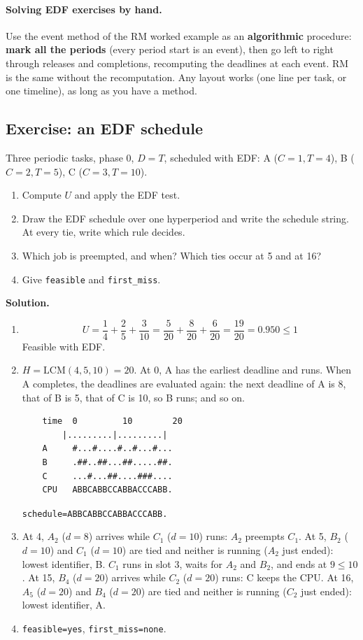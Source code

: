 \paragraph{Solving EDF exercises by hand.} Use the event method of the RM worked example as an \textbf{algorithmic} procedure: \textbf{mark all the periods} (every period start is an event), then go left to right through releases and completions, recomputing the deadlines at each event. RM is the same without the recomputation. Any layout works (one line per task, or one timeline), as long as you have a method.

\subsection{Exercise: an EDF schedule}
Three periodic tasks, phase 0, $D = T$, scheduled with EDF: A ($C = 1, T = 4$), B ($C = 2, T = 5$), C ($C = 3, T = 10$).
\begin{enumerate}
    \item Compute $U$ and apply the EDF test.
    \item Draw the EDF schedule over one hyperperiod and write the schedule string. At every tie, write which rule decides.
    \item Which job is preempted, and when? Which ties occur at 5 and at 16?
    \item Give \texttt{feasible} and \texttt{first\_miss}.
\end{enumerate}

\textbf{Solution.}
\begin{enumerate}
    \item \[
    U = \frac{1}{4} + \frac{2}{5} + \frac{3}{10} = \frac{5}{20} + \frac{8}{20} + \frac{6}{20} = \frac{19}{20} = 0.950 \le 1
    \]
    Feasible with EDF.
    \item $H = \mathrm{LCM}(4, 5, 10) = 20$. At 0, A has the earliest deadline and runs. When A completes, the deadlines are evaluated again: the next deadline of A is 8, that of B is 5, that of C is 10, so B runs; and so on.
\begin{verbatim}
    time  0         10        20
        |.........|.........|
    A     #...#....#..#...#...
    B     .##..##...##.....##.
    C     ...#...##....###....
    CPU   ABBCABBCCABBACCCABB.
\end{verbatim}
    \texttt{schedule=ABBCABBCCABBACCCABB.}
    \item At 4, $A_2$ ($d = 8$) arrives while $C_1$ ($d = 10$) runs: $A_2$ preempts $C_1$. At 5, $B_2$ ($d = 10$) and $C_1$ ($d = 10$) are tied and neither is running ($A_2$ just ended): lowest identifier, B. $C_1$ runs in slot 3, waits for $A_2$ and $B_2$, and ends at $9 \le 10$. At 15, $B_4$ ($d = 20$) arrives while $C_2$ ($d = 20$) runs: C keeps the CPU. At 16, $A_5$ ($d = 20$) and $B_4$ ($d = 20$) are tied and neither is running ($C_2$ just ended): lowest identifier, A.
    \item \texttt{feasible=yes}, \texttt{first\_miss=none}.
\end{enumerate}

